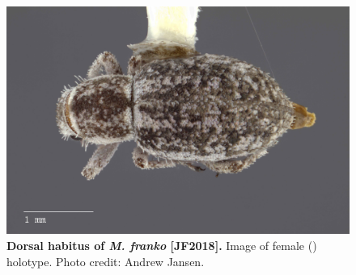 \documentclass[fleqn,10pt,lineno]{wlpeerj} %
\begin{document}
\begin{figure}[h]
	\begin{sideways}
		\centering
		\includegraphics[height=\textwidth]{figure14.jpg}
	\end{sideways}
	\caption{\textbf{Dorsal habitus of \textit{M. franko} [JF2018].} Image of female (\female) holotype. Photo credit: Andrew Jansen.}
	\label{fig:franko_F_dorsal}
\end{figure}
\end{document}
